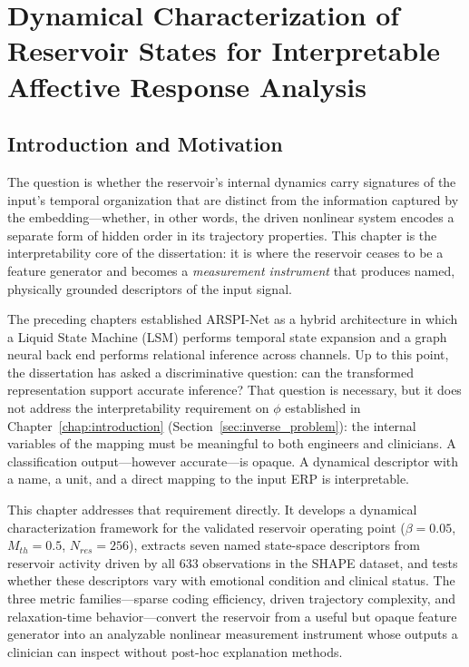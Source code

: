\chapter{Dynamical Characterization of Reservoir States for Interpretable Affective Response Analysis}
\label{chap:dynamics}

\section{Introduction and Motivation}

The question is whether the reservoir's internal dynamics carry signatures of the input's temporal organization that are distinct from the information captured by the embedding---whether, in other words, the driven nonlinear system encodes a separate form of hidden order in its trajectory properties. This chapter is the interpretability core of the dissertation: it is where the reservoir ceases to be a feature generator and becomes a \emph{measurement instrument} that produces named, physically grounded descriptors of the input signal.

The preceding chapters established ARSPI-Net as a hybrid architecture in which a Liquid State Machine (LSM) performs temporal state expansion and a graph neural back end performs relational inference across channels. Up to this point, the dissertation has asked a discriminative question: can the transformed representation support accurate inference? That question is necessary, but it does not address the interpretability requirement on $\phi$ established in Chapter~\ref{chap:introduction} (Section~\ref{sec:inverse_problem}): the internal variables of the mapping must be meaningful to both engineers and clinicians. A classification output---however accurate---is opaque. A dynamical descriptor with a name, a unit, and a direct mapping to the input ERP is interpretable.

This chapter addresses that requirement directly. It develops a dynamical characterization framework for the validated reservoir operating point ($\beta = 0.05$, $M_{th}=0.5$, $N_{res}=256$), extracts seven named state-space descriptors from reservoir activity driven by all $633$ observations in the SHAPE dataset, and tests whether these descriptors vary with emotional condition and clinical status. The three metric families---sparse coding efficiency, driven trajectory complexity, and relaxation-time behavior---convert the reservoir from a useful but opaque feature generator into an analyzable nonlinear measurement instrument whose outputs a clinician can inspect without post-hoc explanation methods.

